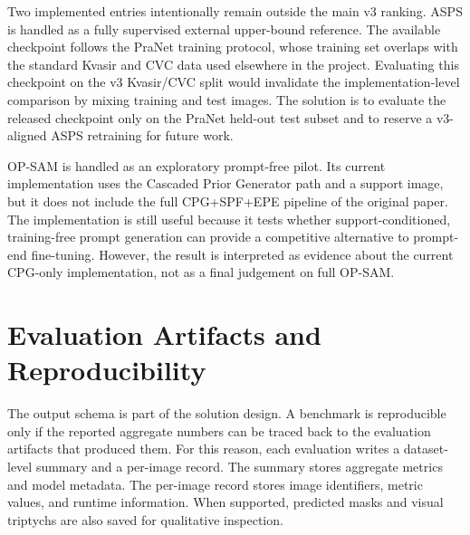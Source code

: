 Two implemented entries intentionally remain outside the main v3 ranking. ASPS is handled as a fully supervised external upper-bound reference. The available checkpoint follows the PraNet training protocol, whose training set overlaps with the standard Kvasir and CVC data used elsewhere in the project. Evaluating this checkpoint on the v3 Kvasir/CVC split would invalidate the implementation-level comparison by mixing training and test images. The solution is to evaluate the released checkpoint only on the PraNet held-out test subset and to reserve a v3-aligned ASPS retraining for future work.

OP-SAM is handled as an exploratory prompt-free pilot. Its current implementation uses the Cascaded Prior Generator path and a support image, but it does not include the full CPG+SPF+EPE pipeline of the original paper. The implementation is still useful because it tests whether support-conditioned, training-free prompt generation can provide a competitive alternative to prompt-end fine-tuning. However, the result is interpreted as evidence about the current CPG-only implementation, not as a final judgement on full OP-SAM.

\section{Evaluation Artifacts and Reproducibility}
\label{sec:artifact-reproducibility}

The output schema is part of the solution design. A benchmark is reproducible only if the reported aggregate numbers can be traced back to the evaluation artifacts that produced them. For this reason, each evaluation writes a dataset-level summary and a per-image record. The summary stores aggregate metrics and model metadata. The per-image record stores image identifiers, metric values, and runtime information. When supported, predicted masks and visual triptychs are also saved for qualitative inspection.

